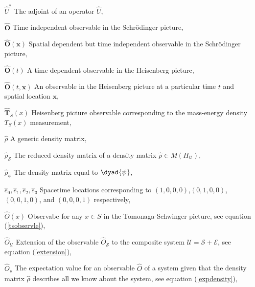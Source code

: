 \begin{thenomenclature}
      \item [{$\hat {U}^*$}]\begingroup The adjoint of an operator $\hat {U}$, \nomrefpage {}
      \item [{$\hat{\bm{O}}$}]\begingroup Time independent observable in the Schr\"{o}dinger picture, \nomrefpage{}
      \item [{$\hat{\bm{O}}(\bm{x})$}]\begingroup Spatial dependent but time independent observable in the Schr\"{o}dinger picture, \nomrefpage{}
      \item [{$\hat{\bm{O}}(t)$}]\begingroup A time dependent observable in the Heisenberg picture, \nomrefpage{}
      \item [{$\hat{\bm{O}}(t, \bm{x})$}]\begingroup An observable in the Heisenberg picture at a particular time $t$ and spatial location $\bm{x}$, \nomrefpage{}
      \item [{$\hat{\bm{T}}_S(x)$}]\begingroup Heisenberg picture observable corresponding to the  mass-energy density $T_S(x)$ measurement, \nomrefpage{}
      \item [{$\hat{\rho}$}]\begingroup A generic density matrix, \nomrefpage{}
      \item [{$\hat{\rho}_\mathcal{S}$}]\begingroup The reduced density matrix of a density matrix $\hat{\rho}\in M(H_\mathcal{U})$, \nomrefpage{}
      \item [{$\hat{\rho}_\psi$}]\begingroup The density matrix equal to $\dyad{\psi}$, \nomrefpage{}
      \item [{$\hat{e}_0, \hat{e}_1, \hat{e}_2, \hat{e}_3$}]\begingroup Spacetime locations corresponding to $(1,0,0,0)$,$(0,1,0,0)$, $(0,0,1,0)$, and $(0,0,0,1)$ respectively, \nomrefpage{}
      \item [{$\hat{O}(x)$}]\begingroup Observabe for any $x\in S$ in the Tomonaga-Schwinger picture, see equation (\ref{tsobservle}), \nomrefpage{}
      \item [{$\hat{O}_\mathcal{U}$}]\begingroup Extension of the observable $\hat{O}_{\mathcal{S}}$ to the composite system $\mathcal{U}=\mathcal{S}+\mathcal{E}$, see equation (\ref{extension}),  \nomrefpage{}
      \item [{$\hat{O}_\rho$}]\begingroup The expectation value  for an observable $\hat{O}$ of a system given that the density matrix $\hat{\rho}$ describes all we know about the system, see equation (\ref{expdensity}), \nomrefpage{}

\end{thenomenclature}
